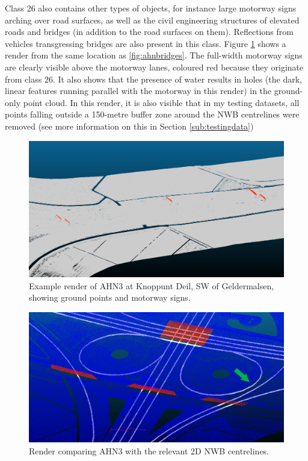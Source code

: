 Class 26 also contains other types of objects, for instance large motorway signs arching over road surfaces, as well as the civil engineering structures of elevated roads and bridges (in addition to the road surfaces on them). Reflections from vehicles transgressing bridges are also present in this class. Figure \ref{fig:ahnsigns} shows a render from the same location as \ref{fig:ahnbridges}. The full-width motorway signs are clearly visible above the motorway lanes, coloured red because they originate from class 26. It also shows that the presence of water results in holes (the dark, linear features running parallel with the motorway in this render) in the ground-only point cloud. In this render, it is also visible that in my testing datasets, all points falling outside a 150-metre buffer zone around the NWB centrelines were removed (see more information on this in Section \ref{sub:testingdata})

\begin{figure}[h!]
    \centering
    \includegraphics[width=\linewidth]{final_report/figs/ahn_sample_02.png} 
    \caption{Example render of AHN3 at Knoppunt Deil, SW of Geldermalsen, showing ground points and motorway signs.}
    \label{fig:ahnsigns}
\end{figure}

\begin{figure}[h!]
    \centering
    \includegraphics[width=\linewidth]{final_report/figs/ahn_sample_04_a.png} 
    \caption{Render comparing AHN3 with the relevant 2D NWB centrelines.}
    \label{fig:ahnnwb}
\end{figure}

